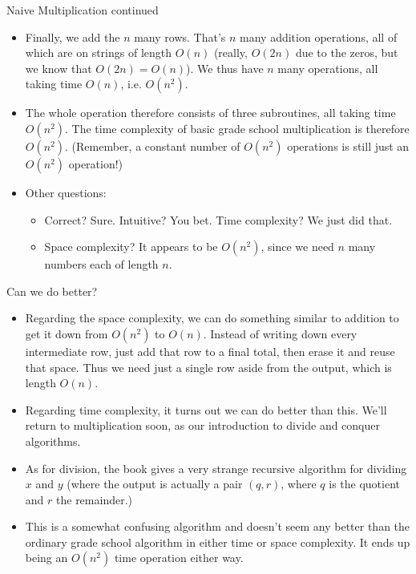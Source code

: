 \documentclass{beamer}
\begin{document}
\begin{frame}{Naive Multiplication continued}
    \begin{itemize}
        \item Finally, we add the $n$ many rows. That's $n$ many addition operations, all of which are on strings of length $O(n)$ (really, $O(2n)$ due to the zeros, but we know that $O(2n) = O(n)$). We thus have $n$ many operations, all taking time $O(n)$, i.e. $O(n^2)$. 
        \pause
        \item The whole operation therefore consists of three subroutines, all taking time $O(n^2)$. The time complexity of basic grade school multiplication is therefore $O(n^2)$. (Remember, a constant number of $O(n^2)$ operations is still just an $O(n^2)$ operation!)
        \pause
        \item Other questions:
        \begin{itemize}
            \item Correct? Sure. Intuitive? You bet. Time complexity? We just did that.
            \item Space complexity? It appears to be $O(n^2)$, since we need $n$ many numbers each of length $n$. 
        \end{itemize}
    \end{itemize}
\end{frame}

\begin{frame}{Can we do better?}
    \begin{itemize}
        \item Regarding the space complexity, we can do something similar to addition to get it down from $O(n^2)$ to $O(n)$. Instead of writing down every intermediate row, just add that row to a final total, then erase it and reuse that space. Thus we need just a single row aside from the output, which is length $O(n)$. 
        \item Regarding time complexity, it turns out we can do better than this. We'll return to multiplication soon, as our introduction to divide and conquer algorithms.  
        \item As for division, the book gives a very strange recursive algorithm for dividing $x$ and $y$ (where the output is actually a pair $(q,r)$, where $q$ is the quotient and $r$ the remainder.) 
        \item This is a somewhat confusing algorithm and doesn't seem any better than the ordinary grade school algorithm in either time or space complexity. It ends up being an $O(n^2)$ time operation either way.
    \end{itemize}
\end{frame}
\end{document}
